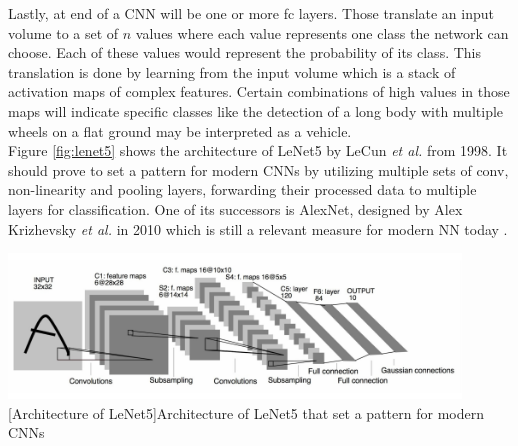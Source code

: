 Lastly, at end of a \ac{CNN} will be one or more \ac{fc} layers. Those translate an input volume to a set of $n$ values where each value represents one class the network can choose. Each of these values would represent the probability of its class. This translation is done by learning from the input volume which is a stack of activation maps of complex features. Certain combinations of high values in those maps will indicate specific classes like the detection of a long body with multiple wheels on a flat ground may be interpreted as a vehicle.\\
Figure \ref{fig:lenet5} shows the architecture of LeNet5 by LeCun \textit{et al.} from 1998. It should prove to set a pattern for modern \acp{CNN} by utilizing multiple sets of \ac{conv}, non-linearity and pooling layers, forwarding their processed data to multiple layers for classification. One of its successors is AlexNet, designed by Alex Krizhevsky \textit{et al.} in 2010 \cite{NIPS2012_4824} which is still a relevant measure for modern \ac{NN} today \cite{DBLP:journals/corr/CanzianiPC16}.

\begin{center}
\noindent\includegraphics[width=12cm]{tex/img/ch03/LeNet5.png}
[Architecture of LeNet5]{Architecture of LeNet5 that set a pattern for modern \acp{CNN} \cite{Lecun98gradient-basedlearning}}
\label{fig:lenet5}
\end{center}

